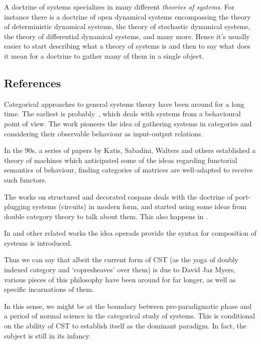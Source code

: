 A doctrine of systems specializes in many different \emph{theories of systems}. For instance there is a doctrine of open dynamical systems encompassing the theory of deterministic dynamical systems, the theory of stochastic dynamical systems, the theory of differential dynamical systems, and many more.
Hence it's usually easier to start describing what a theory of systems is and then to say what does it mean for a doctrine to gather many of them in a single object.

\subsection{References}
Categorical approaches to general systems theory have been around for a long time.
The earliest is probably~\cite{rosen1978fundamentals}, which deals with systems from a behavioural point of view. The work pioneers the idea of gathering systems in categories and considering their observable behaviour as input-output relations.

In the 90s, a series of papers by Katis, Sabadini, Walters and others established a theory of machines \cite{sabadini_functions_1993, bloom_matrices_1996, katis1997bicategories, katis1997span, katis_algebra_1999, katis2002feedback} which anticipated some of the ideas regarding functorial semantics of behaviour, finding categories of matrices are well-adapted to receive such functors.

The works on structured and decorated cospans \cite{fiadeiro2007structured,fong2015decorated, baez2020open,baez2020structured,Baez2022structuredversus} deals with the doctrine of port-plugging systems (circuits) in modern form, and started using some ideas from double category theory to talk about them.
This also happens in \cite{lerman2018networks,culbertson2020formal}.

In \cite{spivak2013operad, libkind2021operadic} and other related works the idea operads provide the syntax for composition of systems is introduced.

Thus we can say that albeit the current form of CST (as the yoga of doubly indexed category and `copresheaves' over them) is due to David Jaz Myers, various pieces of this philosophy have been around for far longer, as well as specific incarnations of them.

In this sense, we might be at the boundary between pre-paradigmatic phase and a period of normal science in the categorical study of systems.
This is conditional on the ability of CST to establish itself as the dominant paradigm. In fact, the subject is still in its infancy.

